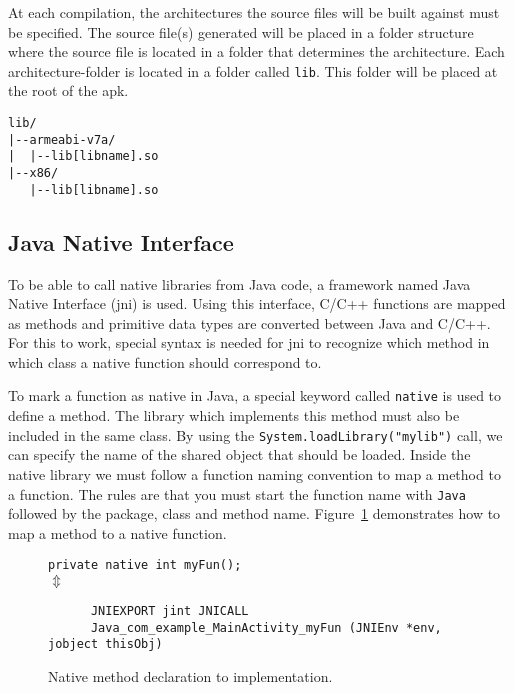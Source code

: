 At each compilation, the architectures the source files will be built against must be specified. The source file(s) generated will be placed in a folder structure where the source file is located in a folder that determines the architecture. Each architecture-folder is located in a folder called \texttt{lib}. This folder will be placed at the root of the \gls{apk}.

\begin{verbatim}
lib/
|--armeabi-v7a/
|  |--lib[libname].so
|--x86/
   |--lib[libname].so
\end{verbatim}


\subsection{Java Native Interface}
To be able to call native libraries from Java code, a framework named Java Native Interface (\gls{jni}) is used. Using this interface, C/C++ functions are mapped as methods and primitive data types are converted between Java and C/C++. For this to work, special syntax is needed for \gls{jni} to recognize which method in which class a native function should correspond to.

To mark a function as native in Java, a special keyword called \texttt{native} is used to define a method. The library which implements this method must also be included in the same class. By using the \texttt{System.loadLibrary("mylib")} call, we can specify the name of the shared object that should be loaded. Inside the native library we must follow a function naming convention to map a method to a function. The rules are that you must start the function name with \texttt{Java} followed by the package, class and method name. Figure~\ref{fig:native} demonstrates how to map a method to a native function.

\begin{figure}[H]
\begin{center}
    \texttt{private native int myFun();}\\
    $\Updownarrow$
    \begin{verbatim}
      JNIEXPORT jint JNICALL
      Java_com_example_MainActivity_myFun (JNIEnv *env, jobject thisObj)
    \end{verbatim}
\end{center}
\caption{Native method declaration to implementation.}
\label{fig:native}
\end{figure}

